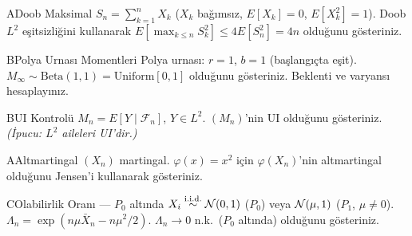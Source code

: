 

\begin{alistirma}[Al.9.3]{A}{Doob Maksimal}
$S_n = \sum_{k=1}^n X_k$ ($X_k$ bağımsız, $E[X_k]=0$, $E[X_k^2]=1$). Doob $L^2$ eşitsizliğini kullanarak $E[\max_{k\leq n}S_k^2]\leq 4E[S_n^2]=4n$ olduğunu gösteriniz.
\end{alistirma}
\begin{alistirma}[Al.9.4b]{B}{Polya Urnası Momentleri}
Polya urnası: $r=1$, $b=1$ (başlangıçta eşit). $M_\infty\sim\mathrm{Beta}(1,1)=\mathrm{Uniform}[0,1]$ olduğunu gösteriniz. Beklenti ve varyansı hesaplayınız.
\end{alistirma}
\begin{alistirma}[Al.9.5b]{B}{UI Kontrolü}
$M_n = E[Y\mid\mathcal{F}_n]$, $Y\in L^2$. $(M_n)$'nin UI olduğunu gösteriniz. \textit{(İpucu: $L^2$ aileleri UI'dir.)}
\end{alistirma}
\alistirmalar




\begin{alistirma}[Al.9.3]{A}{Altmartingal}
$(X_n)$ martingal. $\varphi(x) = x^2$ için $\varphi(X_n)$'nin altmartingal
olduğunu Jensen'i kullanarak gösteriniz.
\end{alistirma}

\begin{alistirma}[Al.9.6]{C}{Olabilirlik Oranı --- $P_0$ altında}
$X_i\overset{\text{i.i.d.}}{\sim}\mathcal{N}(0,1)$ ($P_0$) veya $\mathcal{N}(\mu,1)$ ($P_1$, $\mu\neq0$). $\Lambda_n = \exp(n\mu\bar{X}_n - n\mu^2/2)$. $\Lambda_n\to0$ n.k.\ ($P_0$ altında) olduğunu gösteriniz.
\end{alistirma}


